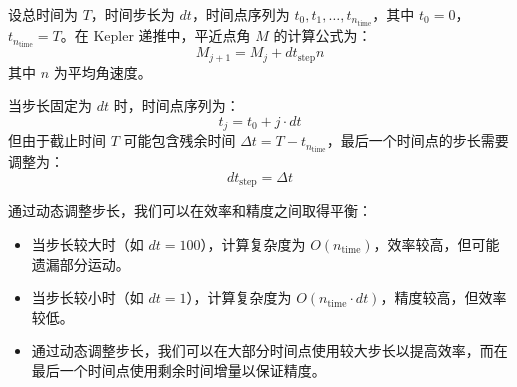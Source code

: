 \documentclass[12pt,a4paper]{article}
\begin{document}
设总时间为 \(T\)，时间步长为 \(dt\)，时间点序列为 \(t_0, t_1, \dots, t_{n_{\text{time}}}\)，其中 \(t_0 = 0\)，\(t_{n_{\text{time}}} = T\)。在 Kepler 递推中，平近点角 \(M\) 的计算公式为：
\[
M_{j+1} = M_j + {dt_{\text{step}}}n
\]
其中 \(n\) 为平均角速度。

当步长固定为 \(dt\) 时，时间点序列为：
\[
t_j = t_0 + j \cdot dt
\]
但由于截止时间 \(T\) 可能包含残余时间 \(\Delta t = T - t_{n_{\text{time}}}\)，最后一个时间点的步长需要调整为：
\[
dt_{\text{step}} = \Delta t
\]

通过动态调整步长，我们可以在效率和精度之间取得平衡：
\begin{itemize}
    \item 当步长较大时（如 \(dt = 100\)），计算复杂度为 \(O(n_{\text{time}})\)，效率较高，但可能遗漏部分运动。
    \item 当步长较小时（如 \(dt = 1\)），计算复杂度为 \(O(n_{\text{time}} \cdot dt)\)，精度较高，但效率较低。
    \item 通过动态调整步长，我们可以在大部分时间点使用较大步长以提高效率，而在最后一个时间点使用剩余时间增量以保证精度。
\end{itemize}
\end{document}
